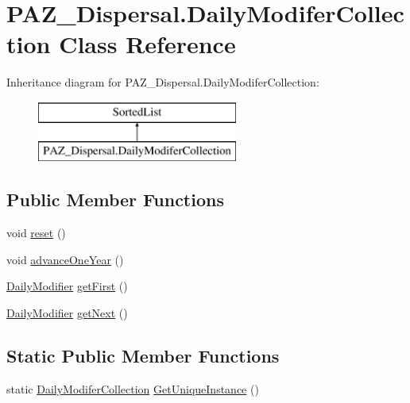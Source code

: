 \hypertarget{class_p_a_z___dispersal_1_1_daily_modifer_collection}{\section{P\-A\-Z\-\_\-\-Dispersal.\-Daily\-Modifer\-Collection Class Reference}
\label{class_p_a_z___dispersal_1_1_daily_modifer_collection}
}
Inheritance diagram for P\-A\-Z\-\_\-\-Dispersal.\-Daily\-Modifer\-Collection\-:\begin{figure}[H]
\begin{center}
\leavevmode
\includegraphics[height=2.000000cm]{class_p_a_z___dispersal_1_1_daily_modifer_collection}
\end{center}
\end{figure}
\subsection*{Public Member Functions}
\begin{DoxyCompactItemize}
\item 
void \hyperlink{class_p_a_z___dispersal_1_1_daily_modifer_collection_a7888174505fe8dde9fa17125cb1eb19f}{reset} ()
\item 
void \hyperlink{class_p_a_z___dispersal_1_1_daily_modifer_collection_a4798854330cdded71731a6e1ea168282}{advance\-One\-Year} ()
\item 
\hyperlink{class_p_a_z___dispersal_1_1_daily_modifier}{Daily\-Modifier} \hyperlink{class_p_a_z___dispersal_1_1_daily_modifer_collection_aae96c9a7f2d1c6ae05d1c07c136f03cd}{get\-First} ()
\item 
\hyperlink{class_p_a_z___dispersal_1_1_daily_modifier}{Daily\-Modifier} \hyperlink{class_p_a_z___dispersal_1_1_daily_modifer_collection_acc5ed80220596c4403354068f2ff9a41}{get\-Next} ()
\end{DoxyCompactItemize}
\subsection*{Static Public Member Functions}
\begin{DoxyCompactItemize}
\item 
static \hyperlink{class_p_a_z___dispersal_1_1_daily_modifer_collection}{Daily\-Modifer\-Collection} \hyperlink{class_p_a_z___dispersal_1_1_daily_modifer_collection_a598bdc024b82c7ead791663b09fb4355}{Get\-Unique\-Instance} ()
\end{DoxyCompactItemize}
